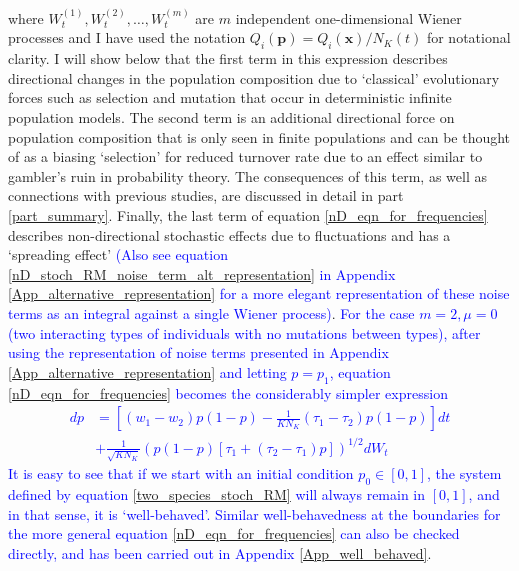 where $W^{(1)}_t,W^{(2)}_t, \ldots, W^{(m)}_t$ are $m$ independent one-dimensional Wiener processes and I have used the notation $Q_i(\mathbf{p}) = Q_i(\mathbf{x})/N_K(t)$ for notational clarity. I will show below that the first term in this expression describes directional changes in the population composition due to `classical' evolutionary forces such as selection and mutation that occur in deterministic infinite population models. The second term is an additional directional force on population composition that is only seen in finite populations and can be thought of as a biasing `selection' for reduced turnover rate due to an effect similar to gambler's ruin in probability theory. The consequences of this term, as well as connections with previous studies, are discussed in detail in part \ref{part_summary}. Finally, the last term of equation \eqref{nD_eqn_for_frequencies} describes non-directional stochastic effects due to fluctuations and has a `spreading effect' \textcolor{blue}{(Also see equation} \eqref{nD_stoch_RM_noise_term_alt_representation} \textcolor{blue}{in Appendix} \ref{App_alternative_representation} \textcolor{blue}{for a more elegant representation of these noise terms as an integral against a single Wiener process)}. \textcolor{blue}{ For the case $m=2, \mu = 0$ (two interacting types of individuals with no mutations between types), after using the representation of noise terms presented in Appendix \ref{App_alternative_representation} and letting $p = p_1$, equation} \eqref{nD_eqn_for_frequencies} \textcolor{blue}{becomes the considerably simpler expression
\begin{equation}
	\label{two_species_stoch_RM}
	\begin{aligned}
		dp &= \left[(w_1 - w_2)p(1-p) - \frac{1}{KN_K}(\tau_1-\tau_2)p(1-p)\right]dt\\
		&+ \frac{1}{\sqrt{KN_K}}\left(p(1-p)\left[\tau_1 + (\tau_2 - \tau_1)p\right]\right)^{1/2}dW_t
	\end{aligned}
\end{equation}
It is easy to see that if we start with an initial condition $p_0 \in [0,1]$, the system defined by equation \eqref{two_species_stoch_RM} will always remain in $[0,1]$, and in that sense, it is `well-behaved'. Similar well-behavedness at the boundaries for the more general equation} \eqref{nD_eqn_for_frequencies} \textcolor{blue}{can also be checked directly, and has been carried out in Appendix} \ref{App_well_behaved}.

